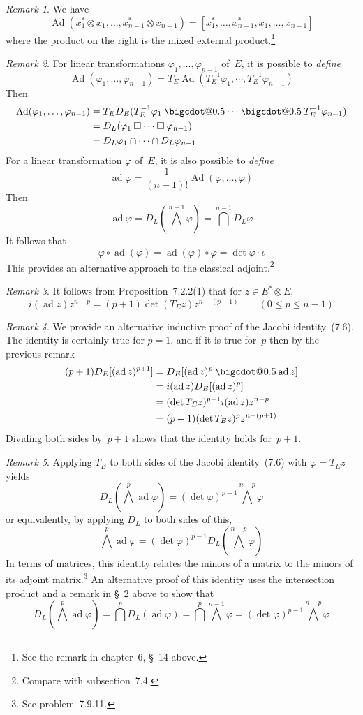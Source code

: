 \documentclass[letterpaper,12pt]{article}
\makeatletter
\DeclareMathOperator{\ad}{ad}
\DeclareMathOperator{\Ad}{Ad}
\newcommand{\bigcdot}[1]{\mathbin{\mathpalette\bigcdot@{#1}}}
\newcommand{\bigcdot@}[2]{%
  \sbox0{$#1\vcenter{}$}%
  \sbox2{$#1\cdot\m@th$}%
  \hbox{%
    \hfil
    \raise\ht0\hbox{%
      \scalebox{#2}{%
        \lower\ht0\hbox{$#1\bullet\m@th$}%
      }%
    }%
    \hfil
  }%
}
\newcommand{\sect}{\cap}
\newcommand{\bigsect}{\bigcap}
\newcommand{\medsect}{{\textstyle\bigsect}}
\newcommand{\after}{\circ}
\newcommand{\mult}{\cdot}
\newcommand{\tprod}{\otimes}
\newcommand{\bigeprod}{\bigwedge}
\newcommand{\medeprod}{{\textstyle\bigeprod}}
\newcommand{\mprod}{\bigcdot{0.5}}
\newcommand{\bprod}{\mathbin{\square}}
\newcommand{\multi}[4]{#2_{#3}#1\cdots#1#2_{#4}}
\newcommand{\sects}[3]{\multi{\sect}{#1}{#2}{#3}}
\newcommand{\mprods}[3]{\multi{\mprod}{#1}{#2}{#3}}
\newcommand{\bprods}[3]{\multi{\bprod}{#1}{#2}{#3}}
\theoremstyle{definition}
\theoremstyle{remark}
\newtheorem*{rmk}{Remark}
\makeatother
\begin{document}
\begin{rmk}
We have
\[\Ad(x^*_1\tprod x_1,\ldots,x^*_{n-1}\tprod x_{n-1})=[x^*_1,\ldots,x^*_{n-1},x_1,\ldots,x_{n-1}]\]
where the product on the right is the mixed external product.\footnote{See the remark in chapter~6, \S~14 above.}
\end{rmk}

\begin{rmk}
For linear transformations \(\varphi_1,\ldots,\varphi_{n-1}\) of~\(E\), it is possible to \emph{define}
\[\Ad(\varphi_1,\ldots,\varphi_{n-1})=T_E\Ad(T_E^{-1}\varphi_1,\cdots,T_E^{-1}\varphi_{n-1})\]
Then
\begin{align*}
\Ad(\varphi_1,\ldots,\varphi_{n-1})&=T_ED_E(\mprods{T_E^{-1}\varphi}{1}{n-1})\\
	&=D_L(\bprods{\varphi}{1}{n-1})\\
	&=\sects{D_L\varphi}{1}{n-1}
\end{align*}
For a linear transformation \(\varphi\) of~\(E\), it is also possible to \emph{define}
\[\ad\varphi=\frac{1}{(n-1)!}\Ad(\varphi,\ldots,\varphi)\]
Then
\[\ad\varphi=D_L(\medeprod^{n-1}\varphi)=\medsect^{n-1}D_L\varphi\]
It follows that
\[\varphi\after\ad(\varphi)=\ad(\varphi)\after\varphi=\det\varphi\mult\iota\]
This provides an alternative approach to the classical adjoint.\footnote{Compare with subsection~7.4.}
\end{rmk}

\begin{rmk}
It follows from Proposition~7.2.2(1) that for \(z\in E^*\tprod E\),
\[i(\ad z)z^{n-p}=(p+1)\det(T_Ez)z^{n-(p+1)}\qquad(0\le p\le n-1)\]
\end{rmk}

\begin{rmk}
We provide an alternative inductive proof of the Jacobi identity~(7.6). The identity is certainly true for \(p=1\), and if it is true for~\(p\) then by the previous remark
\begin{align*}
(p+1)D_E[(\ad z)^{p+1}]&=D_E[(\ad z)^p\mprod\ad z]\\
	&=i(\ad z)D_E[(\ad z)^p]\\
	&=(\det T_Ez)^{p-1}i(\ad z)z^{n-p}\\
	&=(p+1)(\det T_Ez)^pz^{n-(p+1)}
\end{align*}
Dividing both sides by~\(p+1\) shows that the identity holds for~\(p+1\).
\end{rmk}

\begin{rmk}
Applying \(T_E\) to both sides of the Jacobi identity~(7.6) with \(\varphi=T_Ez\) yields
\[D_L(\medeprod^p\ad\varphi)=(\det\varphi)^{p-1}\medeprod^{n-p}\varphi\]
or equivalently, by applying \(D_L\) to both sides of this,
\[\medeprod^p\ad\varphi=(\det\varphi)^{p-1}D_L(\medeprod^{n-p}\varphi)\]
In terms of matrices, this identity relates the minors of a matrix to the minors of its adjoint matrix.\footnote{See problem~7.9.11.} An alternative proof of this identity uses the intersection product and a remark in \S~2 above to show that
\[D_L(\medeprod^p\ad\varphi)=\medsect^p D_L(\ad\varphi)=\medsect^p\medeprod^{n-1}\varphi=(\det\varphi)^{p-1}\medeprod^{n-p}\varphi\]
\end{rmk}
\end{document}

